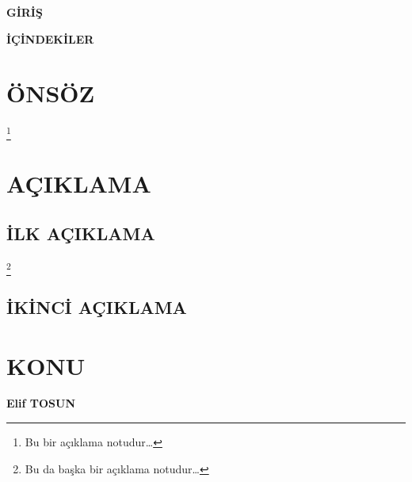 \documentclass[12px]{article}
\begin{document}
\begin{center}
    \Huge{\textbf{GİRİŞ}}
\end{center}

\newpage
\begin{center}
    \Huge{\textbf{İÇİNDEKİLER}}
\end{center}


\newpage
{} %
\onehalfspacing %

\section*{ÖNSÖZ}
\begin{plain}
    \textsf{\lipsum[1-3]}\footnote{Bu bir açıklama notudur\ldots}
\end{plain}

\section*{AÇIKLAMA}
\begin{plain}
    \subsection{İLK AÇIKLAMA}
    \textsf{\lipsum[4-6]}\footnote{Bu da başka bir açıklama notudur\ldots}
    \subsection{İKİNCİ AÇIKLAMA}
    \textsf{\lipsum[7-9]}
\end{plain}

\section{KONU}
\begin{plain}
    \textsf{\lipsum[10-12]}
    
    \hfill\textbf{\textsf{Elif TOSUN}}
\end{plain}
\end{document}
